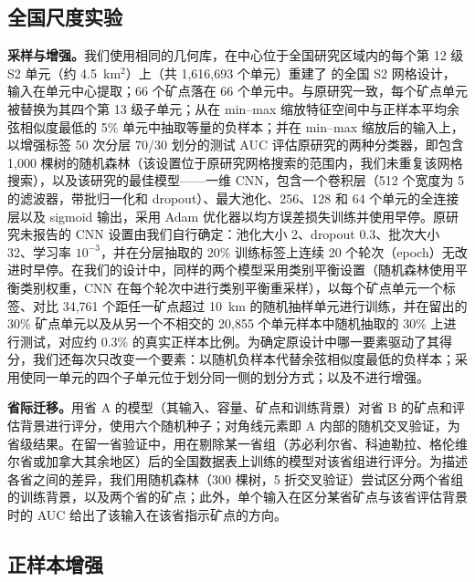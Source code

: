 \documentclass[pdflatex,sn-apa]{sn-jnl}
\begin{document}
\subsection{全国尺度实验}\label{sec:national-methods}

\textbf{采样与增强。}我们使用相同的几何库，在中心位于全国研究区域内的每个第 12 级 S2 单元（约 4.5~km$^2$）上（共 1,616,693 个单元）重建了 \citet{Parsa2024} 的全国 S2 网格设计，输入在单元中心提取；66 个矿点落在 66 个单元中。与原研究一致，每个矿点单元被替换为其四个第 13 级子单元；从在 min--max 缩放特征空间中与正样本平均余弦相似度最低的 5\% 单元中抽取等量的负样本；并在 min--max 缩放后的输入上，以增强标签 50 次分层 70/30 划分的测试 AUC 评估原研究的两种分类器，即包含 1,000 棵树的随机森林（该设置位于原研究网格搜索的范围内，我们未重复该网格搜索），以及该研究的最佳模型——一维 CNN，包含一个卷积层（512 个宽度为 5 的滤波器，带批归一化和 dropout）、最大池化、256、128 和 64 个单元的全连接层以及 sigmoid 输出，采用 Adam 优化器以均方误差损失训练并使用早停。原研究未报告的 CNN 设置由我们自行确定：池化大小 2、dropout 0.3、批次大小 32、学习率 $10^{-3}$，并在分层抽取的 20\% 训练标签上连续 20 个轮次（epoch）无改进时早停。在我们的设计中，同样的两个模型采用类别平衡设置（随机森林使用平衡类别权重，CNN 在每个轮次中进行类别平衡重采样），以每个矿点单元一个标签、对比 34,761 个距任一矿点超过 10~km 的随机抽样单元进行训练，并在留出的 30\% 矿点单元以及从另一个不相交的 20,855 个单元样本中随机抽取的 30\% 上进行测试，对应约 0.3\% 的真实正样本比例。为确定原设计中哪一要素驱动了其得分，我们还每次只改变一个要素：以随机负样本代替余弦相似度最低的负样本；采用使同一单元的四个子单元位于划分同一侧的划分方式；以及不进行增强。

\textbf{省际迁移。}用省 A 的模型（其输入、容量、矿点和训练背景）对省 B 的矿点和评估背景进行评分，使用六个随机种子；对角线元素即 A 内部的随机交叉验证，为省级结果。在留一省验证中，用在剔除某一省组（苏必利尔省、科迪勒拉、格伦维尔省或加拿大其余地区）后的全国数据表上训练的模型对该省组进行评分。为描述各省之间的差异，我们用随机森林（300 棵树，5 折交叉验证）尝试区分两个省组的训练背景，以及两个省的矿点；此外，单个输入在区分某省矿点与该省评估背景时的 AUC 给出了该输入在该省指示矿点的方向。

\subsection{正样本增强}\label{sec:augmentation}
\end{document}
